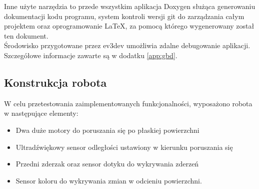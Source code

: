 Inne użyte narzędzia to przede wszystkim aplikacja Doxygen służąca generowaniu dokumentacji kodu programu, system kontroli wersji \gls{git} do zarządzania całym projektem oraz oprogramowanie LaTeX, za pomocą którego wygenerowany został ten dokument.\\

Środowisko przygotowane przez ev3dev umożliwia zdalne debugowanie aplikacji. Szczegółowe informacje zawarte są w dodatku \ref{app:gbd}.

\subsection{Konstrukcja robota}
W celu przetestowania zaimplementowanych funkcjonalności, wyposażono robota w następujące elementy:
\begin{itemize}
    \item Dwa duże motory do poruszania się po płaskiej powierzchni
    \item Ultradźwiękowy sensor odległości ustawiony w kierunku poruszania się
    \item Przedni zderzak oraz sensor dotyku do wykrywania zderzeń
    \item Sensor koloru do wykrywania zmian w odcieniu powierzchni.
\end{itemize}
